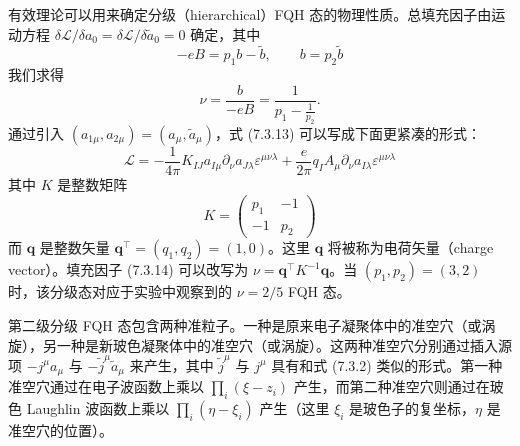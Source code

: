 有效理论可以用来确定分级（hierarchical）FQH 态的物理性质。总填充因子由运动方程
$\delta\mathcal{L}/\delta a_{0}\allowbreak=\delta\mathcal{L}/\delta\tilde{a}_{0}\allowbreak=0$ 确定，其中
\begin{equation*}
-eB=p_{1}b-\tilde{b},\qquad b=p_{2}\tilde{b}
\end{equation*}
我们求得
\begin{equation*}
\nu=\frac{b}{-eB}=\frac{1}{p_{1}-\frac{1}{p_{2}}}. \tag{7.3.14}
\end{equation*}
通过引入 $(a_{1\mu},a_{2\mu})=(a_{\mu},\tilde{a}_{\mu})$，式 (7.3.13) 可以写成下面更紧凑的形式：
\begin{equation*}
\mathcal{L}=-\frac{1}{4\pi}K_{IJ}a_{I\mu}\partial_{\nu}a_{J\lambda}\varepsilon^{\mu\nu\lambda}
+\frac{e}{2\pi}q_{I}A_{\mu}\partial_{\nu}a_{I\lambda}\varepsilon^{\mu\nu\lambda} \tag{7.3.15}
\end{equation*}
其中 $K$ 是整数矩阵
\begin{equation*}
K=\begin{pmatrix} p_{1} & -1\\ -1 & p_{2} \end{pmatrix}
\end{equation*}
而 $\boldsymbol{q}$ 是整数矢量 $\boldsymbol{q}^{\top}=(q_{1},q_{2})=(1,0)$。这里 $\boldsymbol{q}$ 将被称为电荷矢量（charge vector）。填充因子 (7.3.14) 可以改写为 $\nu=\boldsymbol{q}^{\top}K^{-1}\boldsymbol{q}$。当 $(p_{1},p_{2})=(3,2)$ 时，该分级态对应于实验中观察到的 $\nu=2/5$ FQH 态。

第二级分级 FQH 态包含两种准粒子。一种是原来电子凝聚体中的准空穴（或涡旋），另一种是新玻色凝聚体中的准空穴（或涡旋）。这两种准空穴分别通过插入源项 $-j^{\mu}a_{\mu}$ 与 $-\tilde{j}^{\mu}\tilde{a}_{\mu}$ 来产生，其中 $\tilde{j}^{\mu}$ 与 $j^{\mu}$ 具有和式 (7.3.2) 类似的形式。第一种准空穴通过在电子波函数上乘以 $\prod_{i}(\xi-z_{i})$ 产生，而第二种准空穴则通过在玻色 Laughlin 波函数上乘以 $\prod_{i}(\eta-\xi_{i})$ 产生（这里 $\xi_{i}$ 是玻色子的复坐标，$\eta$ 是准空穴的位置）。

